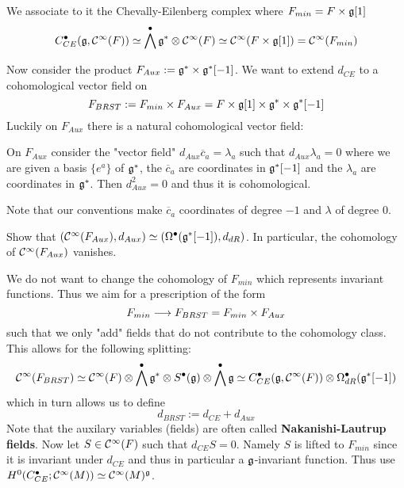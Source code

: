 We associate to it the Chevally-Eilenberg complex where $F_{min} = F \times \mathfrak{g}[1]$
\begin{equation}
  C_{CE}^\bullet (\mathfrak{g}, \mathcal{C}^{\infty}(F)) \simeq \bigwedge^\bullet \mathfrak{g}^* \otimes \mathcal{C}^{\infty}(F) \simeq \mathcal{C}^{\infty}(F \times \mathfrak{g}[1]) = \mathcal{C}^{\infty}(F_{min})
\end{equation}

Now consider the product $F_{Aux} := \mathfrak{g}^* \times \mathfrak{g}^*[-1]$. We want to extend $d_{CE}$ to a cohomological vector field on
\begin{equation}
  F_{BRST} := F_{min} \times F_{Aux} = F \times \mathfrak{g}[1] \times \mathfrak{g}^* \times \mathfrak{g}^*[-1]
\end{equation}
Luckily on $F_{Aux}$ there is a natural cohomological vector field:

\begin{lem}
  On $F_{Aux}$ consider the "vector field" $d_{Aux} \overline{c}_a = \lambda_a$ such that $d_{Aux} \lambda_a = 0$ where we are given a basis $\{e^a\}$ of $\mathfrak{g}^*$, the $\overline{c}_a$ are coordinates in $\mathfrak{g}^*[-1]$ and the $\lambda_a$ are coordinates in $\mathfrak{g}^*$. Then $d^2_{Aux} = 0$ and thus it is cohomological.
\end{lem}

Note that our conventions make $\overline{c}_a$ coordinates of degree $-1$ and $\lambda$ of degree $0$.

\begin{ex}
  Show that $\left( \mathcal{C}^{\infty}(F_{Aux}), d_{Aux} \right) \simeq \left( \Omega^\bullet(\mathfrak{g}^*[-1]), d_{dR} \right)$. In particular, the cohomology of $\mathcal{C}^{\infty}(F_{Aux})$ vanishes.
\end{ex}

We do not want to change the cohomology of $F_{min}$ which represents invariant functions. Thus we aim for a prescription of the form
\begin{equation}F_{min} \longrightarrow F_{BRST} = F_{min} \times F_{Aux} \end{equation}
such that we only "add" fields that do not contribute to the cohomology class. This allows for the following splitting:
\begin{equation}
  \mathcal{C}^{\infty}(F_{BRST}) \simeq \mathcal{C}^{\infty}(F) \otimes \bigwedge^\bullet \mathfrak{g}^* \otimes S^\bullet(\mathfrak{g}) \otimes \bigwedge^\bullet \mathfrak{g} \simeq C_{CE}^\bullet (\mathfrak{g}, \mathcal{C}^{\infty}(F)) \otimes \Omega^\bullet_{dR}(\mathfrak{g}^*[-1])
\end{equation}
which in turn allows us to define
\begin{equation}
  d_{BRST} := d_{CE} + d_{Aux}
\end{equation}
Note that the auxilary variables (fields) are often called \textbf{Nakanishi-Lautrup fields}. Now let $S \in \mathcal{C}^{\infty}(F)$ such that $d_{CE} S = 0$. Namely $S$ is lifted to $F_{min}$ since it is invariant under $d_{CE}$ and thus in particular a $\mathfrak{g}$-invariant function. Thus use $H^0 (C_{CE}^\bullet; \mathcal{C}^{\infty}(M)) \simeq \mathcal{C}^{\infty}(M)^{\mathfrak{g}}$.\\

